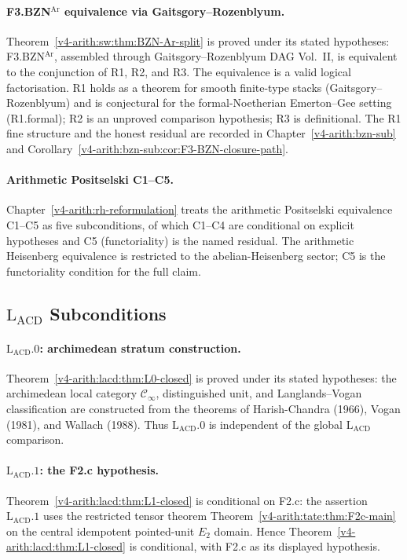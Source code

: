 \paragraph{F3.BZN\({}^{\mathrm{Ar}}\) equivalence via Gaitsgory--Rozenblyum.}
Theorem~\ref{v4-arith:sw:thm:BZN-Ar-split} is proved under its stated hypotheses:
F3.BZN\({}^{\mathrm{Ar}}\), assembled through Gaitsgory--Rozenblyum
DAG Vol.~II, is equivalent to the conjunction of R1, R2, and R3.
The equivalence is a valid logical factorisation. R1 holds as a
theorem for smooth finite-type stacks (Gaitsgory--Rozenblyum) and
is conjectural for the formal-Noetherian Emerton--Gee
setting (R1.formal); R2 is an unproved comparison hypothesis; R3 is
definitional. The R1 fine structure and the honest residual are
recorded in Chapter~\ref{v4-arith:bzn-sub} and
Corollary~\ref{v4-arith:bzn-sub:cor:F3-BZN-closure-path}.

\paragraph{Arithmetic Positselski C1--C5.}
Chapter~\ref{v4-arith:rh-reformulation} treats the arithmetic Positselski
equivalence C1--C5 as five subconditions, of which C1--C4 are
conditional on explicit hypotheses and C5 (functoriality) is the
named residual. The arithmetic Heisenberg equivalence is restricted to
the abelian-Heisenberg sector; C5 is the functoriality condition for
the full claim.

\subsection{\(\mathrm{L}_{\mathrm{ACD}}\) Subconditions}
\label{v4-arith:w3-comparison-A:ch31}

\paragraph{\(\mathrm{L}_{\mathrm{ACD}}.0\): archimedean stratum construction.}
Theorem~\ref{v4-arith:lacd:thm:L0-closed} is proved under its stated hypotheses: the
archimedean local category \(\mathcal{C}_{\infty}\), distinguished
unit, and Langlands--Vogan classification are constructed
from the theorems of Harish-Chandra (1966), Vogan (1981), and
Wallach (1988). Thus \(\mathrm{L}_{\mathrm{ACD}}.0\) is independent of
the global \(\mathrm{L}_{\mathrm{ACD}}\) comparison.

\paragraph{\(\mathrm{L}_{\mathrm{ACD}}.1\): the F2.c hypothesis.}
Theorem~\ref{v4-arith:lacd:thm:L1-closed} is conditional
on F2.c: the assertion \(\mathrm{L}_{\mathrm{ACD}}.1\)
uses the restricted tensor theorem
Theorem~\ref{v4-arith:tate:thm:F2c-main} on the central idempotent
pointed-unit \(E_{2}\) domain. Hence
Theorem~\ref{v4-arith:lacd:thm:L1-closed} is conditional, with F2.c as its displayed
hypothesis.

